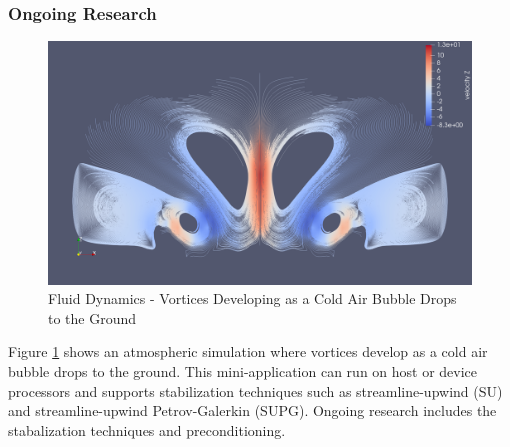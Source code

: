 \subsubsection{Ongoing Research}
\begin{figure}[ht!]
\includegraphics[width=.99\linewidth]{../img/Vortices}
\caption{Fluid Dynamics - Vortices Developing as a Cold Air Bubble Drops to the Ground}
\label{fig:vortices}
\end{figure}

Figure \ref{fig:vortices} shows an atmospheric simulation where vortices develop as a cold air bubble drops to the ground.
This mini-application can run on host or device processors and supports stabilization techniques such as streamline-upwind (SU) and streamline-upwind Petrov-Galerkin (SUPG).
Ongoing research includes the stabalization techniques and preconditioning.